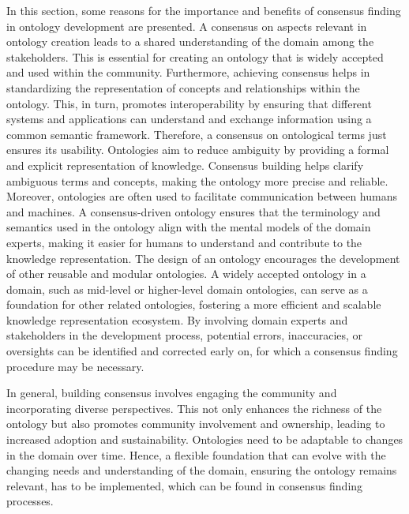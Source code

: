 In this section, some reasons for the importance and benefits of consensus finding in ontology development are presented.
A consensus on aspects relevant in ontology creation leads to a shared understanding of the domain among the stakeholders. This is essential for creating an ontology that is widely accepted and used within the community. Furthermore, achieving consensus helps in standardizing the representation of concepts and relationships within the ontology. This, in turn, promotes interoperability by ensuring that different systems and applications can understand and exchange information using a common semantic framework. Therefore, a consensus on ontological terms just ensures its usability. Ontologies aim to reduce ambiguity by providing a formal and explicit representation of knowledge. Consensus building helps clarify ambiguous terms and concepts, making the ontology more precise and reliable. Moreover, ontologies are often used to facilitate communication between humans and machines. A consensus-driven ontology ensures that the terminology and semantics used in the ontology align with the mental models of the domain experts, making it easier for humans to understand and contribute to the knowledge representation.
The design of an ontology encourages the development of other reusable and modular ontologies. A widely accepted ontology in a domain, such as mid-level or higher-level domain ontologies, can serve as a foundation for other related ontologies, fostering a more efficient and scalable knowledge representation ecosystem. By involving domain experts and stakeholders in the development process, potential errors, inaccuracies, or oversights can be identified and corrected early on, for which a consensus finding procedure may be necessary.

In general, building consensus involves engaging the community and incorporating diverse perspectives. This not only enhances the richness of the ontology but also promotes community involvement and ownership, leading to increased adoption and sustainability.
Ontologies need to be adaptable to changes in the domain over time. Hence, a flexible foundation that can evolve with the changing needs and understanding of the domain, ensuring the ontology remains relevant, has to be implemented, which can be found in consensus finding processes.

